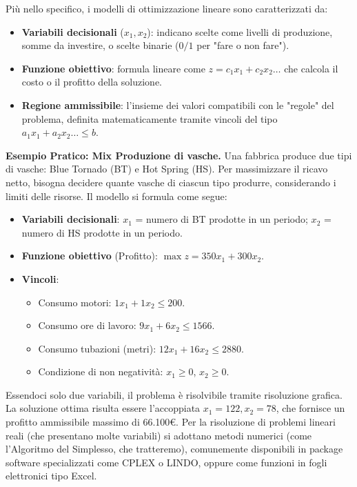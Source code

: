 \documentclass[12pt]{extarticle} %
\begin{document}
Più nello specifico, i modelli di ottimizzazione lineare sono caratterizzati da:
\begin{itemize}
    \item \textbf{Variabili decisionali} ($x_1, x_2$): indicano scelte come livelli di produzione, somme da investire, o scelte binarie ($0/1$ per "fare o non fare").
    \item \textbf{Funzione obiettivo}: formula lineare come $z = c_1x_1 + c_2x_2\dots$ che calcola il costo o il profitto della soluzione.
    \item \textbf{Regione ammissibile}: l'insieme dei valori compatibili con le "regole" del problema, definita matematicamente tramite vincoli del tipo $a_1x_1 + a_2x_2\dots \le b$.
\end{itemize}

\textbf{Esempio Pratico: Mix Produzione di vasche.}
Una fabbrica produce due tipi di vasche: Blue Tornado (BT) e Hot Spring (HS). Per massimizzare il ricavo netto, bisogna decidere quante vasche di ciascun tipo produrre, considerando i limiti delle risorse.
Il modello si formula come segue:
\begin{itemize}
    \item \textbf{Variabili decisionali}: $x_1$ = numero di BT prodotte in un periodo; $x_2$ = numero di HS prodotte in un periodo.
    \item \textbf{Funzione obiettivo} (Profitto): $\max z = 350x_1 + 300x_2$.
    \item \textbf{Vincoli}:
    \begin{itemize}
        \item Consumo motori: $1x_1 + 1x_2 \le 200$.
        \item Consumo ore di lavoro: $9x_1 + 6x_2 \le 1566$.
        \item Consumo tubazioni (metri): $12x_1 + 16x_2 \le 2880$.
        \item Condizione di non negatività: $x_1 \ge 0$, $x_2 \ge 0$.
    \end{itemize}
\end{itemize}
Essendoci solo due variabili, il problema è risolvibile tramite risoluzione grafica. La soluzione ottima risulta essere l'accoppiata $x_1=122, x_2=78$, che fornisce un profitto ammissibile massimo di 66.100€.
Per la risoluzione di problemi lineari reali (che presentano molte variabili) si adottano metodi numerici (come l'Algoritmo del Simplesso, che tratteremo), comunemente disponibili in package software specializzati come CPLEX o LINDO, oppure come funzioni in fogli elettronici tipo Excel.
\end{document}
